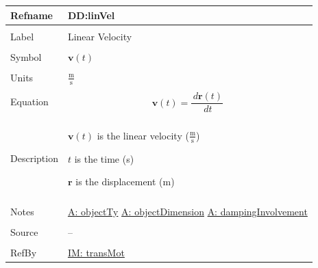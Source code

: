 \documentclass[12pt]{article}
\begin{document}
\noindent \begin{minipage}{\textwidth}
\begin{tabular}{>{\raggedright}p{}>{\raggedright\arraybackslash}p{}}
\toprule \textbf{Refname} & \textbf{DD:linVel}
\label{DD:linVel}
\\ \midrule \\
Label & Linear Velocity
\\ \midrule \\
Symbol & $\mathbf{v}(t)$
\\ \midrule \\
Units & $\frac{\text{m}}{\text{s}}$
\\ \midrule \\
Equation & \begin{displaymath}
           \mathbf{v}(t)=\frac{\,d\mathbf{r}\left(t\right)}{\,dt}
           \end{displaymath}
\\ \midrule \\
Description & \begin{symbDescription}
              \item{$\mathbf{v}(t)$ is the linear velocity ($\frac{\text{m}}{\text{s}}$)}
              \item{$t$ is the time (s)}
              \item{$\mathbf{r}$ is the displacement (m)}
              \end{symbDescription}
\\ \midrule \\
Notes & \hyperref[assumpOT]{A: objectTy}
        \hyperref[assumpOD]{A: objectDimension}
        \hyperref[assumpDI]{A: dampingInvolvement}
\\ \midrule \\
Source & --
\\ \midrule \\
RefBy & \hyperref[IM:transMot]{IM: transMot}
\\ \bottomrule
\end{tabular}
\end{minipage}
\par~
\end{document}

